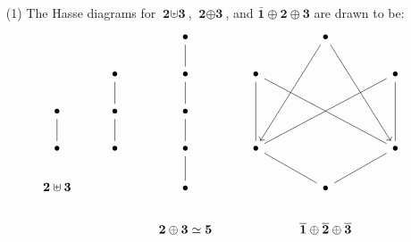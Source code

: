 \begin{example}\label{example_1.11}
  \begin{enumerate}
    \item[(1)] The Hasse diagrams for $\textbf{2} \uplus \textbf{3}$,
      $\textbf{2} \oplus \textbf{3}$, and $\bar{\textbf{1}} \oplus
      \textbf{2} \oplus \textbf{3}$ are drawn to be:
      \[\begin{tikzcd}
        && \bullet && \bullet \\
        & \bullet & \bullet & \bullet && \bullet \\
        \bullet & \bullet & \bullet \\
        \bullet & \bullet & \bullet & \bullet && \bullet \\
        {\textbf{2} \uplus \textbf{3}} && \bullet && \bullet \\
                                       && {\textbf{2} \oplus \textbf{3} \simeq \textbf{5}} && {\bar{\textbf{1}} \oplus \bar{\textbf{2}} \oplus \bar{\textbf{3}}}
                                       \arrow[from=1-5, to=4-4]
                                       \arrow[from=1-5, to=4-6]
                                       \arrow[no head, from=2-3, to=1-3]
                                       \arrow[no head, from=3-2, to=2-2]
                                       \arrow[no head, from=3-3, to=2-3]
                                       \arrow[no head, from=4-1, to=3-1]
                                       \arrow[no head, from=4-2, to=3-2]
                                       \arrow[no head, from=4-3, to=3-3]
                                       \arrow[no head, from=4-4, to=2-4]
                                       \arrow[no head, from=4-4, to=2-6]
                                       \arrow[no head, from=4-6, to=2-4]
                                       \arrow[no head, from=4-6, to=2-6]
                                       \arrow[no head, from=5-3, to=4-3]
                                       \arrow[no head, from=5-5, to=4-4]
                                       \arrow[no head, from=5-5, to=4-6]
      \end{tikzcd}\]


\end{enumerate}
\end{example}
